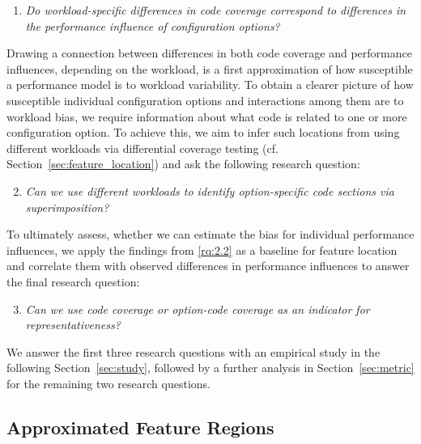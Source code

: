 \begin{enumerate}[align=left,label=RQ\,2.\arabic*,leftmargin=5.5em,labelwidth=5em]
	\item\textit{Do workload-specific differences in code coverage correspond to differences in the performance influence of configuration options?}\label{rq:2.1}
\end{enumerate}

Drawing a connection between differences in both code coverage and performance influences, depending on the workload, is a first approximation of how susceptible a performance model is to workload variability. To obtain a clearer picture of how susceptible individual configuration options and interactions among them are to workload bias, we require information about what code is related to one or more configuration option. To achieve this, we aim to infer such locations from using different workloads via differential coverage testing (cf. Section~\ref{sec:feature_location}) and ask the following research question:

\begin{enumerate}[align=left,label=RQ\,2.\arabic*,leftmargin=5.5em,labelwidth=5em]
	\setcounter{enumi}{1}
	\item\textit{Can we use different workloads to identify option-specific code sections via superimposition?}\label{rq:2.2}
\end{enumerate}

To ultimately assess, whether we can estimate the bias for individual performance influences, we apply the findings from \ref{rq:2.2} as a baseline for feature location and correlate them with observed differences in performance influences to answer the final research question:

\begin{enumerate}[align=left,label=RQ\,2.\arabic*,leftmargin=5.5em,labelwidth=5em]
	\setcounter{enumi}{2}
	\item\textit{Can we use code coverage or option-code coverage as an indicator for representativeness?}\label{rq:2.3}
\end{enumerate}

We answer the first three research questions with an empirical study in the following Section~\ref{sec:study}, followed by a further analysis in Section~\ref{sec:metric} for the remaining two research questions.


\subsection{Approximated Feature Regions}

